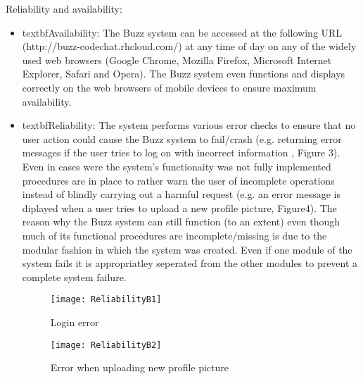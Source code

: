 \item Reliability and availability:

\begin{itemize}
	\item textbf{Availability: }
	The Buzz system can be accessed at the following URL (http://buzz-codechat.rhcloud.com/) at any time of day on any of the widely used 	web browsers (Google Chrome, Mozilla Firefox, Microsoft Internet Explorer, Safari and Opera). The Buzz system even functions and displays 	correctly on the web browsers of mobile devices to ensure maximum availability.
	\item textbf{Reliability: }
	The system performs various error checks to ensure that no user action could cause the Buzz system to fail/crash (e.g. returning error messages if the user tries to log on with incorrect information , Figure 3). Even in cases were the system’s functionaity was not fully implemented procedures are in place to rather warn the user of incomplete operations instead of blindly carrying out a harmful request (e.g. an error message is diplayed when a user tries to upload a new profile picture, Figure4). The reason why the Buzz system can still function (to an extent) even though much of its functional procedures are incomplete/missing is due to the modular fashion in which the system was created. Even if one module of the system fails it is appropriatley seperated from the other modules to prevent a complete system failure.

\begin{figure}[h!]
  \centering
    \texttt{[image: ReliabilityB1]}
    \caption{Login error}
\end{figure}

\begin{figure}[h!]
  \centering
    \texttt{[image: ReliabilityB2]}
    \caption{Error when uploading new profile picture}
\end{figure}

\end{itemize}
	
